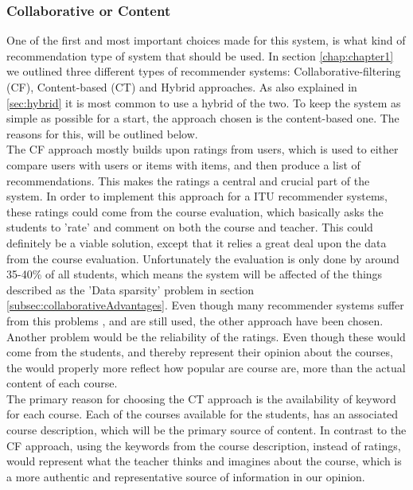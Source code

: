 \subsubsection*{Collaborative or Content}
One of the first and most important choices made for this system, is what kind of recommendation type of system that should be used. In section \ref{chap:chapter1} we outlined three different types of recommender systems: Collaborative-filtering (CF), Content-based (CT) and Hybrid approaches. As also explained in \ref{sec:hybrid} it is most common to use a hybrid of the two. To keep the system as simple as possible for a start, the approach chosen is the content-based one. The reasons for this, will be outlined below. \\
The CF approach mostly builds upon ratings from users, which is used to either compare users with users or items with items, and then produce a list of recommendations. This makes the ratings a central and crucial part of the system. In order to implement this approach for a ITU recommender systems, these ratings could come from the course evaluation, which basically asks the students to 'rate' and comment on both the course and teacher. This could definitely be a viable solution, except that it relies a great deal upon the data from the course evaluation. Unfortunately the evaluation is only done by around 35-40\% of all students, which means the system will be affected of the things described as the 'Data sparsity' problem in section \ref{subsec:collaborativeAdvantages}. Even though many recommender systems suffer from this problems , and are still used, the other approach have been chosen.\newline 
Another problem would be the reliability of the ratings. Even though these would come from the students, and thereby represent their opinion about the courses, the would properly more reflect how popular are course are, more than the actual content of each course.\\ 
The primary reason for choosing the CT approach is the availability of keyword for each course. Each of the courses available for the students, has an associated course description, which will be the primary source of content. In contrast to the CF approach, using the keywords from the course description, instead of ratings, would represent what the teacher thinks and imagines about the course, which is a more authentic and representative source of information in our opinion. 


